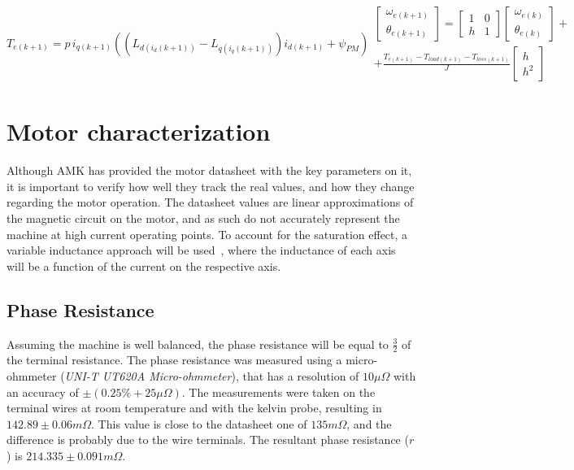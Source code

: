 \documentclass[9pt,conference]{IEEEtran}
\begin{document}
\begin{subequations}
	\begin{equation}
		T_{e(k+1)}  = p\, i_{q(k+1)}((L_{d(i_d(k+1))} - L_{q(i_q(k+1))})i_{d(k+1)} + \psi_{PM})
	\end{equation}

	\begin{equation}
		\begin{aligned}
			\begin{bmatrix}
				\omega_{e(k+1)} \\
				\theta_{e(k+1)}
			\end{bmatrix}
			=
			\begin{bmatrix}
				1 & 0 \\
				h & 1
			\end{bmatrix}
			\begin{bmatrix}
				\omega_{e(k)} \\
				\theta_{e(k)}
			\end{bmatrix}+\\+
			\frac{T_{e(k+1)}-T_{load(k+1)} - T_{loss(k+1)}}{J}
			\begin{bmatrix}
				h \\
				h^2
			\end{bmatrix}
		\end{aligned}
	\end{equation}
	\label{eq:motor_backward_euler_matrix}
\end{subequations}

\section{Motor characterization}
\label{section:motor_characterization}
Although AMK has provided the motor datasheet with the key parameters on it, it is important to verify how well they track the real values, and how they change regarding the motor operation. The datasheet values are linear approximations of the magnetic circuit on the motor, and as such do not accurately represent the machine at high current operating points. To account for the saturation effect, a variable inductance approach will be used~\cite{Wijenayake:saturation_model:1997,Stumberger:saturation_model:2003}, where the inductance of each axis will be a function of the current on the respective axis. 
\subsection{Phase Resistance}
Assuming the machine is well balanced, the phase resistance will be equal to $\frac{3}{2}$ of the terminal resistance. The phase resistance was measured using a micro-ohmmeter (\textit{UNI-T UT620A Micro-ohmmeter}), that has a resolution of $10\mu \Omega$ with an accuracy of $\pm (0.25\% + 25\mu \Omega)$. The measurements were taken on the terminal wires at room temperature and with the kelvin probe, resulting in $142.89 \pm 0.06 m\Omega$. This value is close to the datasheet one of $135 m\Omega$, and the difference is probably due to the wire terminals. The resultant phase resistance ($r$) is $214.335 \pm 0.091 m\Omega$.
\end{document}
